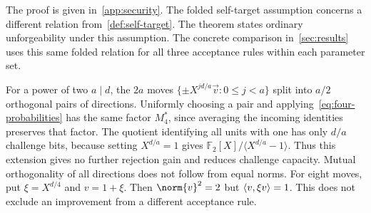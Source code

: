 The proof is given in~\cref{app:security}. The folded self-target assumption concerns a different relation from~\cref{def:self-target}. The theorem states ordinary unforgeability under this assumption. The concrete comparison in~\cref{sec:results} uses this same folded relation for all three acceptance rules within each parameter set.

\begin{remark}
\label{rem:more-moves}
For a power of two $a\mid d$, the $2a$ moves $\{\pm X^{jd/a}\vec v:0\le j<a\}$ split into $a/2$ orthogonal pairs of directions. Uniformly choosing a pair and applying~\cref{eq:four-probabilities} has the same factor $M_4^*$, since averaging the incoming identities preserves that factor. The quotient identifying all units with one has only $d/a$ challenge bits, because setting $X^{d/a}=1$ gives $\mathbb F_2[X]/\langle X^{d/a}-1\rangle$. Thus this extension gives no further rejection gain and reduces challenge capacity. Mutual orthogonality of all directions does not follow from equal norms. For eight moves, put $\xi=X^{d/4}$ and $v=1+\xi$. Then $\norm{v}^2=2$ but $\langle v,\xi v\rangle=1$. This does not exclude an improvement from a different acceptance rule.
\end{remark}

\FloatBarrier
